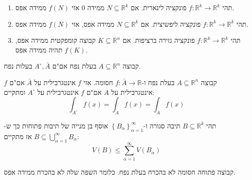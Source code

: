 \documentclass{tstextbook}
\begin{document}
\begin{proposition}
  \begin{enumerate}
    \item תהי \(f:\mathbb{R}^k\to\mathbb{R}^k\) פונקציה לינארית. אם \(N\subseteq \mathbb{R}^k\) ממידה 0 אזי \(f(N)\) ממידה אפס. 


    \item תהי \(f:\mathbb{R}^k\to\mathbb{R}^k\) פונקציה ליפשיצית. אם \(N\subseteq \mathbb{R}^k\) ממידה אפס, אזי \(f(N)\) ממידה אפס. 


    \item תהי \(f:\mathbb{R}^k\to\mathbb{R}^k\) פונקציה גזירה ברציפות. אם \(K\subseteq \mathbb{R}^n\) קבוצה קומפקטית ממידה אפס, \(f(K)\) תהיה ממידה אפס. 


  \end{enumerate}
\end{proposition}
\begin{proposition}
קבוצה \(A\subseteq \mathbb{R}^n\) בעלת נפח אם"ם \(A^\circ,\bar{A}\) בעלות נפח.

\end{proposition}
\begin{proposition}
קבוצה \(A\subseteq \mathbb{R}^n\) בעלת נפח ו-\(f:\bar{A}\to \mathbb{R}\) חסומה. אזי \(f\) אינטגרבילית על \(\bar{A}\) אם"ם \(f\) אינטגרבילית על \(A\) אם"ם \(f\) אינטגרבילית על \(A^\circ\) ומתקיים:
$$\int_{A^\circ }f(x)=\int_{A}f(x)=\int_{\bar{A}}f(x)$$

\end{proposition}
\begin{proposition}
תהי \(B\subseteq \mathbb{R}^k\) תיבה סגורה ו-\(\left\{  B_{\alpha}  \right\}_{\alpha=1}^\infty\)  אוסף בן מנייה של תיבות פתוחות כך ש-\(B\subseteq \bigcup_{\alpha=1}^\infty B_{\alpha}\) אז מתקיים:
$$V(B)\le\sum_{\alpha=1}^{\infty}V(B_{\alpha})$$

\end{proposition}
\begin{proposition}
קבוצה פתוחה חסומה לא בהכרח בעלת נפח. כלומר השפה שלה לא בהכרח ממידה אפס.

\end{proposition}
\end{document}
